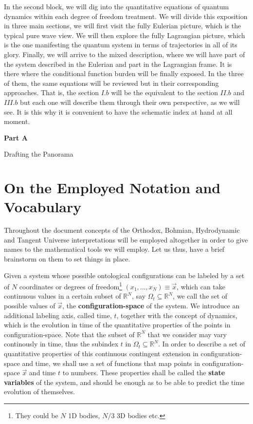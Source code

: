 \documentclass[11pt, a4paper]{article} %
\newcommand{\R}{\mathbb{R}} %
\newenvironment{kapituloBerria}[1][]
  {\clearpage           %
   \thispagestyle{empty}%
   \vspace*{\stretch{2}}%
   \raggedleft          %
   {\textbf{{\fontsize{60}{40}\selectfont \hspace{+9.5cm}#1\newline \newline}}}
   \bf
   \fontsize{30}{20}\selectfont
  }
  {\par %
   \vspace{\stretch{3}} %
   \clearpage           %
  }
\begin{document}
In the second block, we will dig into the quantitative equations of quantum dynamics within each degree of freedom treatment. We will divide this exposition in three main sections, we will first visit the fully Eulerian picture, which is the typical pure wave view. We will then explore the fully Lagrangian picture, which is the one manifesting the quantum system in terms of trajectories in all of its glory. Finally, we will arrive to the mixed description, where we will have part of the system described in the Eulerian and part in the Lagrangian frame. It is there where the conditional function burden will be finally exposed. In the three of them, the same equations will be reviewed but in their corresponding approaches. That is, the section $I.b$ will be the equivalent to the section $II.b$ and $III.b$ but each one will describe them through their own perspective, as we will see. It is this why it is convenient to have the schematic index at hand at all moment.

\newpage

\begin{kapituloBerria}[Part A]
Drafting the Panorama
\end{kapituloBerria}

\pagestyle{fancy}

\section*{On the Employed Notation and Vocabulary}

Throughout the document concepts of the Orthodox, Bohmian, Hydrodynamic and Tangent Universe interpretations will be employed altogether in order to give names to the mathematical tools we will employ. Let us thus, have a brief brainstorm on them to set things in place.

Given a system whose possible ontological configurations can be labeled by a set of $N$ coordinates or degrees of freedom\footnote{They could be $N$ 1D bodies, $N/3$ 3D bodies etc.} $(x_1, ...,x_N)\equiv \vec{x}$, which can take continuous values in a certain subset of $\R^N$, say $\Omega_t\subseteq \R^N$, we call the set of possible values of $\vec{x}$, the {\bf configuration-space} of the system. We introduce an additional labeling axis, called time, $t$, together with the concept of dynamics, which is the evolution in time of the quantitative properties of the points in configuration-space. Note that the subset of $\R^N$ that we consider may vary continously in time, thus the subindex $t$ in $\Omega_t\subseteq \R^N$. In order to describe a set of quantitative properties of this continuous contingent extension in configuration-space and time, we shall use a set of functions that map points in configuration-space $\vec{x}$ and time $t$ to numbers. These properties shall be called the {\bf state variables} of the system, and should be enough as to be able to predict the time evolution of themselves. 
\end{document}
